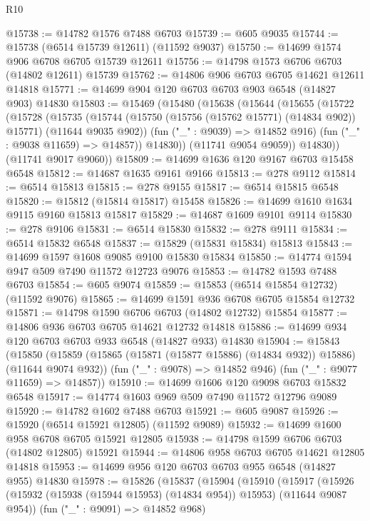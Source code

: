 \begin{lexlean}{R10}
\begin{coremodule}
@15738 := @14782 @1576 @7488 @6703
@15739 := @605 @9035
@15744 := @15738 (@6514 @15739 @12611) (@11592 @9037)
@15750 := @14699 @1574 @906 @6708 @6705 @15739 @12611
@15756 := @14798 @1573 @6706 @6703 (@14802 @12611) @15739
@15762 := @14806 @906 @6703 @6705 @14621 @12611 @14818
@15771 := @14699 @904 @120 @6703 @6703 @903 @6548 (@14827 @903) @14830
@15803 := @15469
    (@15480
      (@15638
        (@15644
          (@15655
            (@15722
              (@15728
                (@15735
                  (@15744
                    (@15750 (@15756 (@15762 @15771) (@14834 @902)) @15771)
                    (@11644 @9035 @902))
                  (fun ("_" : @9039) => @14852 @916)
                  (fun ("_" : @9038 @11659) => @14857))
                @14830))
            (@11741 @9054 @9059))
          @14830))
      (@11741 @9017 @9060))
@15809 := @14699 @1636 @120 @9167 @6703 @15458 @6548
@15812 := @14687 @1635 @9161 @9166
@15813 := @278 @9112
@15814 := @6514 @15813
@15815 := @278 @9155
@15817 := @6514 @15815 @6548
@15820 := @15812 (@15814 @15817) @15458
@15826 := @14699 @1610 @1634 @9115 @9160 @15813 @15817
@15829 := @14687 @1609 @9101 @9114
@15830 := @278 @9106
@15831 := @6514 @15830
@15832 := @278 @9111
@15834 := @6514 @15832 @6548
@15837 := @15829 (@15831 @15834) @15813
@15843 := @14699 @1597 @1608 @9085 @9100 @15830 @15834
@15850 := @14774 @1594 @947 @509 @7490 @11572 @12723 @9076
@15853 := @14782 @1593 @7488 @6703
@15854 := @605 @9074
@15859 := @15853 (@6514 @15854 @12732) (@11592 @9076)
@15865 := @14699 @1591 @936 @6708 @6705 @15854 @12732
@15871 := @14798 @1590 @6706 @6703 (@14802 @12732) @15854
@15877 := @14806 @936 @6703 @6705 @14621 @12732 @14818
@15886 := @14699 @934 @120 @6703 @6703 @933 @6548 (@14827 @933) @14830
@15904 := @15843
    (@15850
      (@15859 (@15865 (@15871 (@15877 @15886) (@14834 @932)) @15886) (@11644 @9074 @932))
      (fun ("_" : @9078) => @14852 @946)
      (fun ("_" : @9077 @11659) => @14857))
@15910 := @14699 @1606 @120 @9098 @6703 @15832 @6548
@15917 := @14774 @1603 @969 @509 @7490 @11572 @12796 @9089
@15920 := @14782 @1602 @7488 @6703
@15921 := @605 @9087
@15926 := @15920 (@6514 @15921 @12805) (@11592 @9089)
@15932 := @14699 @1600 @958 @6708 @6705 @15921 @12805
@15938 := @14798 @1599 @6706 @6703 (@14802 @12805) @15921
@15944 := @14806 @958 @6703 @6705 @14621 @12805 @14818
@15953 := @14699 @956 @120 @6703 @6703 @955 @6548 (@14827 @955) @14830
@15978 := @15826
    (@15837
      (@15904
        (@15910
          (@15917
            (@15926 (@15932 (@15938 (@15944 @15953) (@14834 @954)) @15953) (@11644 @9087 @954))
            (fun ("_" : @9091) => @14852 @968)

\end{coremodule}
\end{lexlean}
